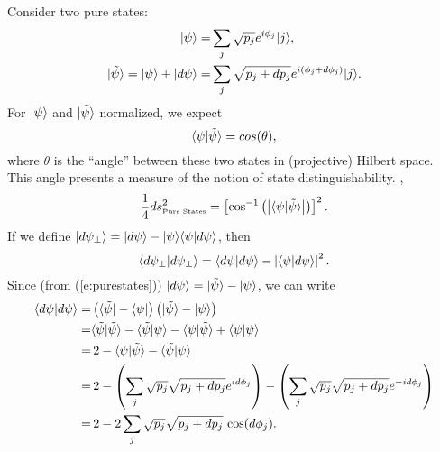Consider two pure states:
\begin{equation}
\begin{split}
    {|{\psi}\rangle} =& \sum_j \sqrt{p_j}e^{i\phi_j}{|{j}\rangle},\\
    {|{\tilde\psi}\rangle} = {|{\psi}\rangle} + {|{d\psi}\rangle} =& 
              \sum_j \sqrt{p_j + dp_j}e^{i(\phi_j + d\phi_j)}{|{j}\rangle}.
\end{split}
\label{e:purestates}
\end{equation}
For ${|{\psi}\rangle}$ and ${|{\tilde\psi}\rangle}$ normalized, we expect
\begin{equation}
{\langle{\psi}|{\tilde\psi}\rangle} = cos(\theta),
\end{equation}
where $\theta$ is the ``angle'' between these two states in 
(projective) Hilbert space.  This angle presents a measure of the
notion of state distinguishability.  \ie,
\begin{equation}
\frac{1}{4}ds_{\text{\tiny Pure States}}^2 = 
    \left[ \cos^{-1}\left(\left|
                        {\langle{\psi}|{\tilde\psi}\rangle}
                    \right|\right)
    \right]^2.
\end{equation}
If we define ${|{d\psi_\perp}\rangle} = {|{d\psi}\rangle} - {|{\psi}\rangle}{\langle{\psi}|{d\psi}\rangle}$, 
then
\begin{equation}
    {\langle{d\psi_\perp}|{d\psi_\perp}\rangle} = 
        {\langle{d\psi}|{d\psi}\rangle} - \left| {\langle{\psi}|{d\psi}\rangle} \right|^2.
\label{e:dPsi_perp}
\end{equation}
Since (from (\ref{e:purestates})) 
${|{d\psi}\rangle} = {|{\tilde\psi}\rangle} - {|{\psi}\rangle}$, we can write
\begin{equation}
\begin{split}
    {\langle{d\psi}|{d\psi}\rangle} 
        =& \left({\langle{\tilde\psi}|}-{\langle{\psi}|}\right)
           \left({|{\tilde\psi}\rangle}-{|{\psi}\rangle}\right)\\
        =& {\langle{\tilde\psi}|{\tilde\psi}\rangle} - {\langle{\tilde\psi}|{\psi}\rangle}
          - {\langle{\psi}|{\tilde\psi}\rangle} + {\langle{\psi}|{\psi}\rangle}\\
        =& \,2 - {\langle{\psi}|{\tilde\psi}\rangle} - {\langle{\tilde\psi}|{\psi}\rangle}\\
        =& \,2 - \left(
                      \sum_j\sqrt{p_j}\sqrt{p_j+dp_j}e^{id\phi_j}
                \right) 
                - \left(
                      \sum_j\sqrt{p_j}\sqrt{p_j+dp_j}e^{-id\phi_j}
                \right)\\
        =& \,2 - 2 \sum_j\sqrt{p_j}\sqrt{p_j+dp_j}
                \,\cos(d\phi_j).
\end{split}
\end{equation}
